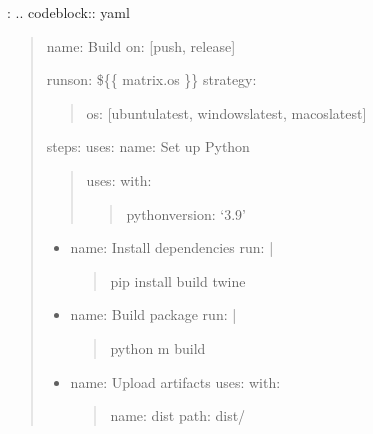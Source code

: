 \documentclass[a4paper,10pt,english,openany,oneside]{sphinxmanual}
\begin{document}
\sphinxAtStartPar
{}:
.. code\sphinxhyphen{}block:: yaml
\begin{quote}

\sphinxAtStartPar
name: Build
on: {[}push, release{]}
\begin{description}
\begin{description}
\sphinxAtStartPar
runs\sphinxhyphen{}on: \$\{\{ matrix.os \}\}
strategy:
\begin{quote}
\begin{description}
\sphinxAtStartPar
os: {[}ubuntu\sphinxhyphen{}latest, windows\sphinxhyphen{}latest, macos\sphinxhyphen{}latest{]}

\end{description}
\end{quote}

\sphinxAtStartPar
steps:
\sphinxhyphen{} uses: 
\sphinxhyphen{} name: Set up Python
\begin{quote}

\sphinxAtStartPar
uses: 
with:
\begin{quote}

\sphinxAtStartPar
python\sphinxhyphen{}version: ‘3.9’
\end{quote}
\end{quote}
\begin{itemize}
\item {} 
\sphinxAtStartPar
name: Install dependencies
run: |
\begin{quote}

\sphinxAtStartPar
pip install build twine
\end{quote}

\item {} 
\sphinxAtStartPar
name: Build package
run: |
\begin{quote}

\sphinxAtStartPar
python \sphinxhyphen{}m build
\end{quote}

\item {} 
\sphinxAtStartPar
name: Upload artifacts
uses: 
with:
\begin{quote}

\sphinxAtStartPar
name: dist
path: dist/
\end{quote}

\end{itemize}

\end{description}

\end{description}
\end{quote}
\end{document}
